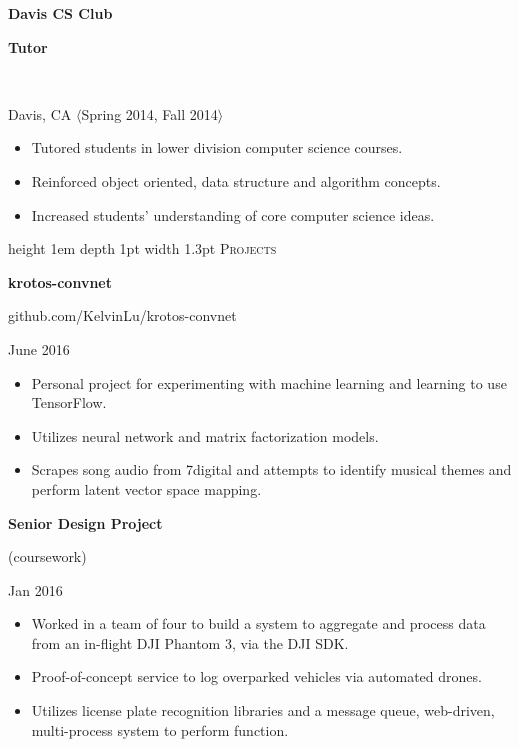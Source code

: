 \documentclass[letterpaper,10pt]{article}
\newcommand{\sectiontitle}[1]{
	{\color{magenta} \vline height 1em depth 1pt width 1.3pt}%
	{\large \colorbox{offwhite}{\color{black} \textsc{#1}}}
	\vspace*{0.5em}
}
\newcommand{\sectionseparator}{
	\vspace*{0.3em}
}
\newcommand{\experiencepanel}[4]{
	\textbf{{#1}}
	\begin{footnotesize}
		\textbf{{#2}}
	\end{footnotesize}
	\\
	\begin{scriptsize}
		{#3} $\langle${#4}$\rangle$
	\end{scriptsize}
}
\newcommand{\projectpanel}[3]{
	\textbf{{#1}}
	\begin{footnotesize}
		{#2}
	\end{footnotesize}
	\begin{scriptsize}
		{#3}
	\end{scriptsize}
}
\newenvironment{statementlist}{
		\begin{small}
		\begin{itemize}
}{
		\end{itemize}
		\end{small}
		\vspace*{0.5em}
}
\begin{document}
\begin{minipage}[t]{0.50\textwidth}
		\experiencepanel{Davis CS Club}{Tutor}{Davis, CA}{Spring 2014, Fall 2014}
		\begin{statementlist}
			\item Tutored students in lower division computer science courses.
			\item Reinforced object oriented, data structure and algorithm concepts.
			\item Increased students' understanding of core computer science ideas.
		\end{statementlist}

		\sectionseparator

		\sectiontitle{Projects}

		\projectpanel{krotos-convnet}{github.com/KelvinLu/krotos-convnet}{June 2016}
		\begin{statementlist}
			\item Personal project for experimenting with machine learning and learning to use TensorFlow.
			\item Utilizes neural network and matrix factorization models.
			\item Scrapes song audio from 7digital and attempts to identify musical themes and perform latent vector space mapping.
		\end{statementlist}

		\projectpanel{Senior Design Project}{(coursework)}{Jan 2016}
		\begin{statementlist}
			\item Worked in a team of four to build a system to aggregate and process data from an in-flight DJI Phantom 3, via the DJI SDK.
			\item Proof-of-concept service to log overparked vehicles via automated drones.
			\item Utilizes license plate recognition libraries and a message queue, web-driven, multi-process system to perform function.
		\end{statementlist}

	\end{minipage}
	\hspace{0.05\textwidth}
\end{document}
